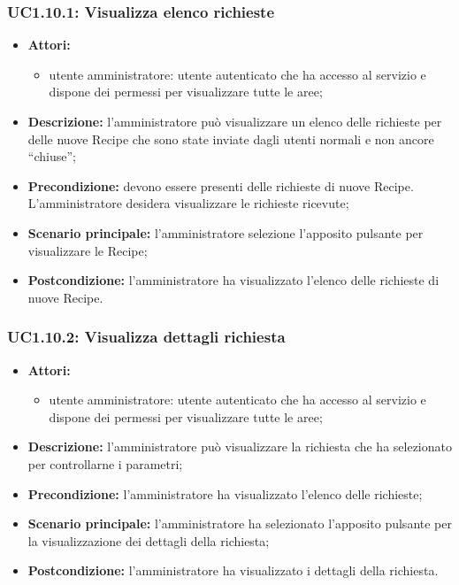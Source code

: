 \subsubsection{UC1.10.1: Visualizza elenco richieste}
	\begin{itemize}
		\item \textbf{Attori:}
		\begin{itemize}
			\item utente amministratore: utente autenticato che ha accesso al servizio e dispone dei permessi per visualizzare tutte le aree;
		\end{itemize}
		\item \textbf{Descrizione:} l'amministratore può visualizzare un elenco delle richieste per delle nuove Recipe che sono state inviate dagli utenti normali e non ancore ``chiuse'';
		\item \textbf{Precondizione:} devono essere presenti delle richieste di nuove Recipe. L'amministratore desidera visualizzare le richieste ricevute;
		\item \textbf{Scenario principale:} l'amministratore selezione l'apposito pulsante per visualizzare le Recipe;
		\item \textbf{Postcondizione:} l'amministratore ha visualizzato l'elenco delle richieste di nuove Recipe.
	\end{itemize}

\subsubsection{UC1.10.2: Visualizza dettagli richiesta}
	\begin{itemize}
		\item \textbf{Attori:}
		\begin{itemize}
			\item utente amministratore: utente autenticato che ha accesso al servizio e dispone dei permessi per visualizzare tutte le aree;
		\end{itemize}
		\item \textbf{Descrizione:} l'amministratore può visualizzare la richiesta che ha selezionato per controllarne i parametri;
		\item \textbf{Precondizione:} l'amministratore ha visualizzato l'elenco delle richieste;
		\item \textbf{Scenario principale:} l'amministratore ha selezionato l'apposito pulsante per la visualizzazione dei dettagli della richiesta;
		\item \textbf{Postcondizione:} l'amministratore ha visualizzato i dettagli della richiesta.
	\end{itemize}

